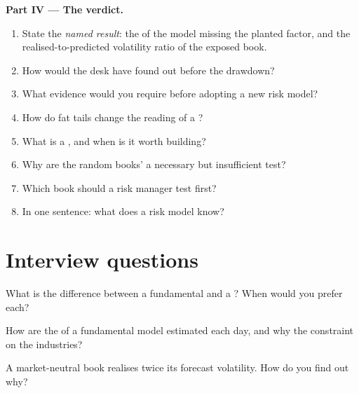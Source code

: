 \begin{problem}
\medskip\noindent\textbf{Part IV --- The verdict.}
\begin{enumerate}[resume]
\item State the \emph{named result}: the  of the model missing the planted factor, and the realised-to-predicted volatility ratio of the exposed
book.
\item How would the desk have found out before the drawdown?
\item What evidence would you require before adopting a new risk model?
\item How do fat tails change the reading of a ?
\item What is a , and when is it worth building?
\item Why are the random books'  a necessary but insufficient test?
\item Which book should a risk manager test first?
\item In one sentence: what does a risk model know?
\end{enumerate}
\end{problem}

\section{Interview questions}

\begin{interviewq}\label{iq:rs:risk-models:1}
What is the difference between a fundamental and a ? When would you prefer each?
\end{interviewq}

\begin{interviewq}\label{iq:rs:risk-models:2}
How are the  of a fundamental model estimated each day, and why the constraint on the industries?
\end{interviewq}

\begin{interviewq}\label{iq:rs:risk-models:3}
A market-neutral book realises twice its forecast volatility. How do you find out why?
\end{interviewq}


